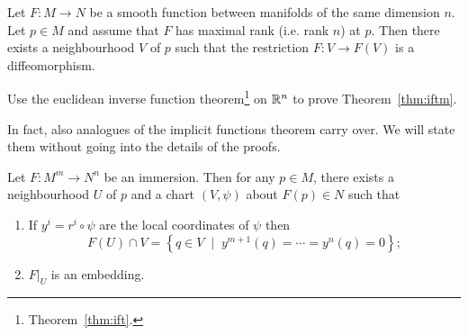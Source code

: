 \begin{theorem}\label{thm:iftm}
  Let $F:M\to N$ be a smooth function between manifolds of the same dimension $n$.
  Let $p\in M$ and assume that $F$ has maximal rank (i.e. rank $n$) at $p$.
  Then there exists a neighbourhood $V$ of $p$ such that the restriction $F:V\to F(V)$ is a diffeomorphism.
\end{theorem}
\begin{exercise}
  Use the euclidean inverse function theorem\footnote{Theorem~\ref{thm:ift}.} on $\mathbb{R}^n$ to prove Theorem~\ref{thm:iftm}.
\end{exercise}


In fact, also analogues of the implicit functions theorem carry over.
We will state them without going into the details of the proofs.

\begin{proposition}\label{prop:slice_chart}
  Let $F:M^m\to N^n$ be an immersion.
  Then for any $p\in M$, there exists a neighbourhood $U$ of $p$ and a chart $(V,\psi)$ about $F(p)\in N$ such that
  \begin{enumerate}
    \item If $y^i = r^i\circ \psi$ are the local coordinates of $\psi$ then
    \begin{equation}\label{eq:slice_chart}
      F(U)\cap V = \left\{ q \in V \;\mid\; y^{m+1}(q)=\cdots=y^n(q)=0\right\};
    \end{equation}
    \item $F\big|_U$ is an embedding.
  \end{enumerate}
 \end{proposition}

